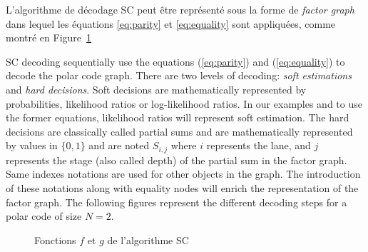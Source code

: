 L'algorithme de décodage SC peut être représenté sous la forme de \textit{factor graph} dans lequel les équations \ref{eq:parity} et \ref{eq:equality} sont appliquées, comme montré en Figure~\ref{fig:SCSchedule}


SC decoding sequentially use the equations  (\ref{eq:parity}) and (\ref{eq:equality}) to decode the polar code graph.
There are two levels of decoding: \textit{soft estimations} and \textit{hard decisions}. Soft decisions are mathematically represented by probabilities, likelihood ratios or log-likelihood ratios. In our examples and to use the former equations, likelihood ratios will represent soft estimation. The hard decisions are classically called partial sums and are mathematically represented by values in $\{0,1\}$ and are noted $S_{i,j}$ where $i$ represents the lane, and $j$ represents the stage (also called depth) of the partial sum in the factor graph. Same indexes notations are used for other objects in the graph. The introduction of these notations along with equality nodes will enrich the representation of the factor graph. The following figures represent the different decoding steps for a polar code of size $N=2$.

\begin{figure}[!ht]
  \centering
  \quad\quad\quad\quad
  \caption{Fonctions $f$ et $g$ de l'algorithme SC}
  \label{fig:SCSchedule}
\end{figure}

